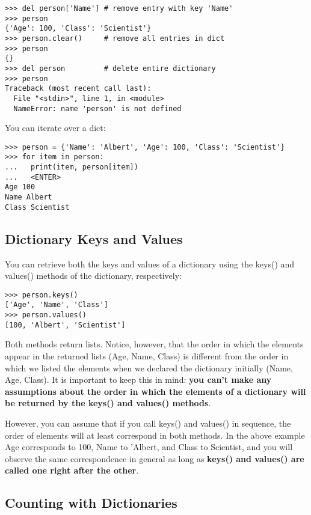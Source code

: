 \begin{verbatim}
>>> del person['Name'] # remove entry with key 'Name'
>>> person
{'Age': 100, 'Class': 'Scientist'}
>>> person.clear()     # remove all entries in dict
>>> person
{}
>>> del person         # delete entire dictionary
>>> person
Traceback (most recent call last):
  File "<stdin>", line 1, in <module>
  NameError: name 'person' is not defined
\end{verbatim}

You can iterate over a dict:

\begin{verbatim}
>>> person = {'Name': 'Albert', 'Age': 100, 'Class': 'Scientist'}
>>> for item in person:
...   print(item, person[item])
...   <ENTER>
Age 100
Name Albert
Class Scientist
\end{verbatim}

\subsection{Dictionary Keys and
Values}\label{dictionary-keys-and-values}

You can retrieve both the keys and values of a dictionary using the
keys() and values() methods of the dictionary, respectively:

\begin{verbatim}
>>> person.keys()
['Age', 'Name', 'Class']
>>> person.values()
[100, 'Albert', 'Scientist']
\end{verbatim}

Both methods return lists. Notice, however, that the order in which the
elements appear in the returned lists (Age, Name, Class) is different
from the order in which we listed the elements when we declared the
dictionary initially (Name, Age, Class). It is important to keep this in
mind: \textbf{you can't make any assumptions about the order in which
the elements of a dictionary will be returned by the keys() and values()
methods}.

However, you can assume that if you call keys() and values() in
sequence, the order of elements will at least correspond in both
methods. In the above example Age corresponds to 100, Name to 'Albert,
and Class to Scientist, and you will observe the same correspondence in
general as long as \textbf{keys() and values() are called one right
after the other}.

\subsection{Counting with
Dictionaries}\label{counting-with-dictionaries}

